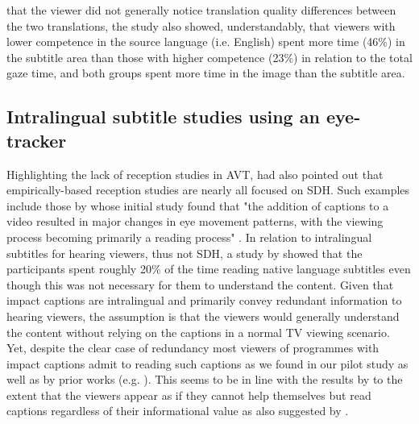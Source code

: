 \documentclass[output=paper]{langsci/langscibook}
\begin{document}
that the viewer did not generally notice translation quality differences between the two translations, the study also showed, understandably, that viewers with lower competence in the source language (i.e. English) spent more time (46\%) in the subtitle area than those with higher competence (23\%) in relation to the total gaze time, and both groups spent more time in the image than the subtitle area.


\subsection{Intralingual subtitle studies using an eye-tracker}

Highlighting the lack of reception studies in AVT, \citet[pg. 30]{gambier2008} had also pointed out that empirically-based reception studies are nearly all focused on SDH.  Such examples include those by \citep{jensema2000a, jensema2000b} whose initial study found that "the addition of captions to a video resulted in major changes in eye movement patterns, with the viewing process becoming primarily a reading process" \citep[pg. 275]{jensema2000a}. In relation to intralingual subtitles for hearing viewers, thus not SDH, a study by \citet{dydewalle1991} showed that the participants spent roughly 20\% of the time reading native language subtitles even though this was not necessary for them to understand the content. Given that impact captions are intralingual and primarily convey redundant information to hearing viewers, the assumption is that the viewers would generally understand the content without relying on the captions in a normal TV viewing scenario. Yet, despite the clear case of redundancy most viewers of programmes with impact captions admit to reading such captions as we found in our pilot study as well as by prior works (e.g. \citet{Kimura2000}). This seems to be in line with the results by \citet{dydewalle1991} to the extent that the viewers appear as if they cannot help themselves but read captions regardless of their informational value as also suggested by \citet{bisson2014}. 
\end{document}
